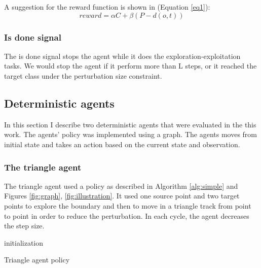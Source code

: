 \documentclass{article}
\begin{document}
A suggestion for the reward function is shown in (Equation \ref{eq1}):
\begin{equation} \label{eq1}
reward = \alpha C + \beta  \left (P-d\left ( o, t \right )  \right )
\end{equation}

\subsubsection{Is done signal}
The is done signal stops the agent while it does the exploration-exploitation tasks. We would stop the agent if it perform more than L steps, or it reached the target class under the perturbation size constraint.

\subsection{Deterministic agents}
In this section I describe two deterministic agents that were evaluated in the this work. The agents' policy was implemented using a graph. The agents moves from initial state and takes an action based on the current state and observation.


\subsubsection{The triangle agent}
The triangle agent used a policy as described in Algorithm \ref{alg:simple} and Figures \ref{fig:graph}, \ref{fig:illustration}. It used one source point and two target points to explore the boundary and then to move in a triangle track from point to point in order to reduce the perturbation. In each cycle, the agent decreases the step size.

\begin{algorithm}[H] \label{alg:simple}
\SetAlgoLined
{}
 initialization\;
 \caption{Triangle agent policy}
\end{algorithm}
\end{document}
